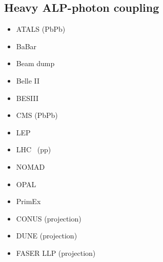 \documentclass[8pt,twocolumn]{extarticle}
\begin{document}
\begin{mdframed}
\vspace{-1em}
\section{Heavy ALP-photon coupling}\vspace{-0.5em}
\begin{itemize}\setlength\itemsep{-0.5em}
    \item ATALS (PbPb)~\cite{ATLAS:2020hii}
    \item BaBar~\cite{Dolan:2017osp}
    \item Beam dump~\cite{CHARM:1985anb,Riordan:1987aw,Dolan:2017osp,Blumlein:1990ay,NA64:2020qwq}
    \item Belle II~\cite{Belle-II:2020jti}
    \item BESIII~\cite{BESIII:2022rzz}
    \item CMS (PbPb)~\cite{CMS:2018erd}
    \item LEP~\cite{Jaeckel:2015jla}
    \item LHC~ (pp)\cite{Knapen:2016moh}
    \item NOMAD~\cite{NOMAD:2000usb}
	 \item OPAL~\cite{Knapen:2016moh}
	 \item PrimEx~\cite{PrimEx:2010fvg,Aloni:2019ruo}
	     \item CONUS (projection)~\cite{Dent:2019ueq}
    \item DUNE (projection)~\cite{Brdar:2020dpr}
    \item FASER LLP (projection)~\cite{FASER:2018eoc}
\end{itemize}
\end{mdframed}
\end{document}
